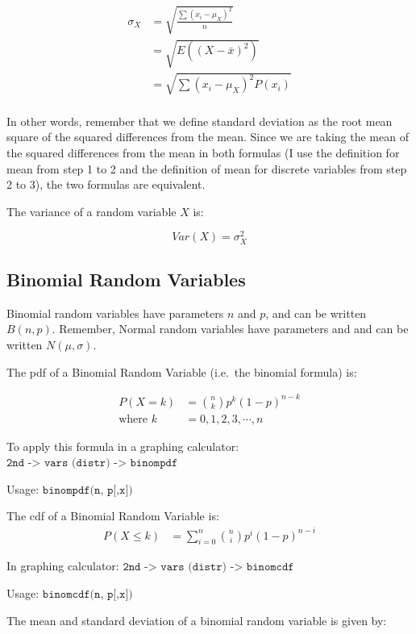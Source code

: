 \documentclass[
]{book}
\theoremstyle{definition}
\theoremstyle{definition}
\theoremstyle{definition}
\theoremstyle{definition}
\theoremstyle{remark}
\begin{document}
\begin{align}
\sigma_X &= \sqrt{\frac{\sum(x_i - \mu_X)^2}{n}} \\
&=\sqrt{E((X - \bar x)^2)} \\
&=\sqrt{\sum \left( x_i - \mu_X \right) ^2 P \left( x_i \right)}\\
\end{align}

In other words, remember that we define standard deviation as the root
mean square of the squared differences from the mean. Since we are
taking the mean of the squared differences from the mean in both
formulas (I use the definition for mean from step 1 to 2 and the
definition of mean for discrete variables from step 2 to 3), the two
formulas are equivalent.

The variance of a random variable \(X\) is:

\[
Var(X) = \sigma_X^2
\]

\hypertarget{binomial-random-variables}{%
\subsection{Binomial Random Variables}\label{binomial-random-variables}}

Binomial random variables have parameters \(n\) and \(p\), and can be
written \(B(n, p)\). Remember, Normal random variables have parameters and
and can be written \(N(\mu,\sigma)\).

The pdf of a Binomial Random Variable (i.e.~the binomial formula) is:

\[
\begin{aligned}
    P(X=k) &= {n \choose k} p^k (1-p)^{n-k}\\
    \text{where } k &= 0, 1, 2, 3, \cdots, n
\end{aligned}
\]

To apply this formula in a graphing calculator:
\(\texttt{2nd -> vars (distr) -> binompdf}\)

Usage: \(\texttt{binompdf(n, p[,x])}\)

The cdf of a Binomial Random Variable is: \[
\begin{aligned}
    P(X\leq k) &= \sum_{i = 0}^n {n \choose i} p^i (1-p)^{n-i}
\end{aligned}
\]

In graphing calculator: \(\texttt{2nd -> vars (distr) -> binomcdf}\)

Usage: \(\texttt{binomcdf(n, p[,x])}\)

The mean and standard deviation of a binomial random variable is given
by:
\end{document}
